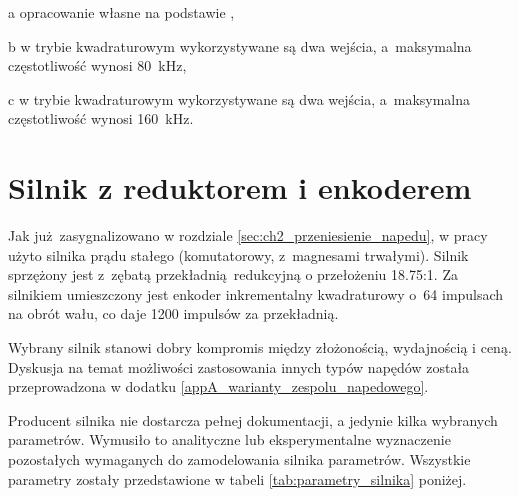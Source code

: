 \begin{table}[H]
\begin{threeparttable}
        \begin{tablenotes}
            \footnotesize
            \item[a] opracowanie własne na podstawie \cite{S7MANUAL},
            \item[b] w trybie kwadraturowym wykorzystywane są dwa wejścia, a~maksymalna częstotliwość wynosi \SI{80}{kHz},
            \item[c] w trybie kwadraturowym wykorzystywane są dwa wejścia, a~maksymalna częstotliwość wynosi \SI{160}{kHz}.
        \end{tablenotes}
    \end{threeparttable}
\end{table}


\section{Silnik z reduktorem i enkoderem}
\label{sec:ch3_uklad_napedowy}

Jak już zasygnalizowano w rozdziale \ref{sec:ch2_przeniesienie_napedu}, w pracy użyto silnika prądu stałego (komutatorowy, z~magnesami trwałymi). Silnik sprzężony jest z~zębatą przekładnią redukcyjną o przełożeniu \num{18,75}:\num{1}. Za silnikiem umieszczony jest enkoder inkrementalny kwadraturowy o~64 impulsach na obrót wału, co daje 1200 impulsów za przekładnią.

Wybrany silnik stanowi dobry kompromis między złożonością, wydajnością i ceną. Dyskusja na temat możliwości zastosowania innych typów napędów została przeprowadzona w dodatku \ref{appA_warianty_zespolu_napedowego}.

Producent silnika nie dostarcza pełnej dokumentacji, a jedynie kilka wybranych parametrów. Wymusiło to analityczne lub eksperymentalne wyznaczenie pozostałych wymaganych do zamodelowania silnika parametrów. Wszystkie parametry zostały przedstawione w tabeli \ref{tab:parametry_silnika} poniżej.

